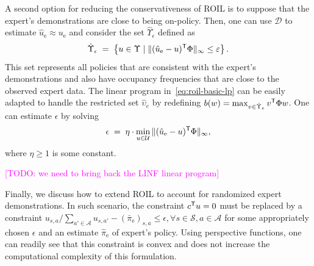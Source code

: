 \documentclass[10pt]{article}
\renewcommand{\cite}{\citep}
\theoremstyle{plain}
\theoremstyle{remark}
\newcommand{\mm}[1]{\textcolor{magenta}{[#1]}}
\begin{document}
A second option for reducing the conservativeness of ROIL is to suppose that the expert's demonstrations are close to being on-policy.
Then, one can use $\mathcal{D}$ to estimate $\hat{u}_{\mathrm{e}} \approx u_{\mathrm{e}}$ and consider the set $\hat{\Upsilon}_{\epsilon}$ defined as
%
\begin{equation}
\label{linf_constraint}
\hat{\Upsilon}_{\epsilon}
\;=\;
\left\{ u \in \Upsilon \mid \| (\hat{u}_{\mathrm{e}} - u)^{\mathsf{T}} \Phi \|_{\infty} \le \varepsilon \right\}.
\end{equation}
This set represents all policies that are consistent with the expert's demonstrations and also have occupancy frequencies that are close to the observed expert data. The linear program in~\eqref{eq:roil-basic-lp} can be easily adapted to handle the restricted set $\hat{\upsilon}_e$ by redefining $b(w) = \max_{v \in \hat{\Upsilon}_e} v^{\mathsf{T}} \Phi  w$. One can estimate $\epsilon$ by solving
\begin{equation}\label{eq:minimal-epsilon}
\epsilon \; =\;  \eta \cdot \min_{u\in \mathcal{U}}
\| (\hat{u}_{\mathrm{e}} - u)^{\mathsf{T}} \Phi \|_{\infty}, 
\end{equation}
where $\eta \ge 1$ is some constant. %


\mm{TODO: we need to bring back the LINF linear program}

Finally, we discuss how to extend ROIL to account for randomized expert demonstrations. In such scenario, the constraint $c^{\mathsf{T}} u = 0$ must be replaced by a constraint $u_{s,a} / \sum_{a'\in \mathcal{A}} u_{s,a'} - (\bar{\pi}_{\mathrm{e}})_{s,a} \le \epsilon, \forall s\in \mathcal{S}, a\in \mathcal{A}$ for some appropriately chosen $\epsilon$ and an estimate $\hat{\pi}_{\mathrm{e}}$ of expert's policy. Using perspective functions, one can readily see that this constraint is convex and does not increase the computational complexity of this formulation.

\end{document}
